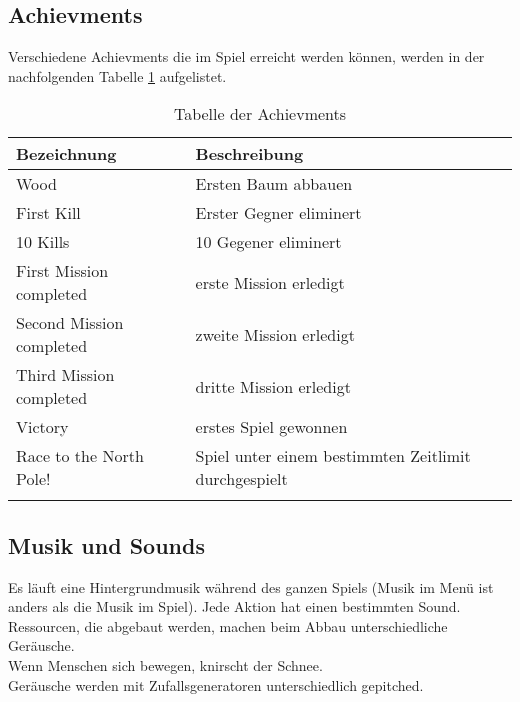 \documentclass[a4paper,
  twoside, %
  headlines=2.1 %
  ]{scrartcl}
\begin{document}
	\subsection{Achievments}
	Verschiedene Achievments die im Spiel erreicht werden können, werden in der nachfolgenden Tabelle \ref{tab:tabelle3} aufgelistet.
	\begin{center}
	\begin{longtable}{ | p{3cm} | p{3cm}| }
	\hline
	Bezeichnung & Beschreibung\\
	\hline
	Wood & Ersten Baum abbauen\\
	\hline
	First Kill & Erster Gegner eliminert\\
	\hline 
	10 Kills & 10 Gegener eliminert\\
	\hline
	First Mission completed &  erste Mission erledigt\\
	\hline
	Second Mission completed & zweite Mission erledigt\\
	\hline
	Third Mission completed & dritte Mission erledigt\\
	\hline
	Victory & erstes Spiel gewonnen\\
	\hline
	Race to the North Pole! & Spiel unter einem bestimmten Zeitlimit durchgespielt\\
	\hline
    \caption{Tabelle der Achievments}
    \label{tab:tabelle3}

	\end{longtable}
	\end{center}   
	
	\subsection{Musik und Sounds}
	Es läuft eine Hintergrundmusik während des ganzen Spiels (Musik im Menü ist anders als die Musik im Spiel). Jede Aktion hat einen bestimmten Sound.\\
	Ressourcen, die abgebaut werden, machen beim Abbau unterschiedliche Geräusche.\\
	Wenn Menschen sich bewegen, knirscht der Schnee.\\
	Geräusche werden mit Zufallsgeneratoren unterschiedlich gepitched.\\
	
\end{document}
